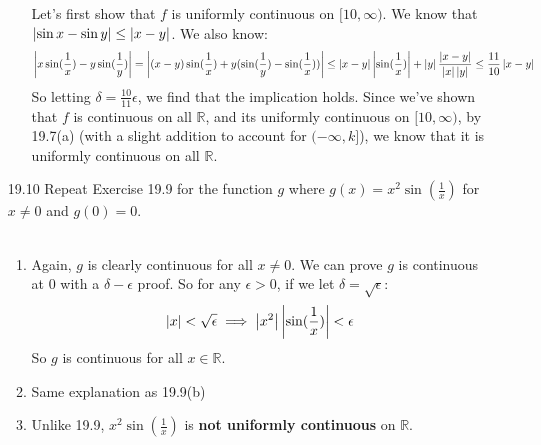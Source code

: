 \begin{enumerate}
\begin{enumerate}
        Let's first show that $f$ is uniformly continuous on $[10,\infty)$. We know that $\left\vert \sin x - \sin y \right\vert \leq \left\vert x - y \right\vert$. We also know:
        $$\left\vert x \sin(\frac{1}{x}) - y \sin(\frac{1}{y}) \right\vert = \left\vert (x-y)\sin(\frac{1}{x}) + y(\sin(\frac{1}{y}) - \sin(\frac{1}{x})) \right\vert \leq \left\vert x-y \right\vert \left\vert \sin(\frac{1}{x}) \right\vert + \left\vert y \right\vert \frac{\left\vert x-y \right\vert}{\left\vert x \right\vert \left\vert y \right\vert} \leq \frac{11}{10} \left\vert x-y \right\vert$$
        So letting $\delta = \frac{10}{11} \epsilon$, we find that the implication holds. Since we've shown that $f$ is continuous on all $\mathds{R}$, and its uniformly continuous on $[10,\infty)$, by 19.7(a) (with a slight addition to account for $(-\infty,k]$), we know that it is uniformly continuous on all $\mathds{R}$.
    \end{enumerate}
  \item [19.10]
    Repeat Exercise 19.9 for the function $g$ where $g(x) = x^2 \sin(\frac{1}{x})$ for $x \neq 0$ and $g(0) = 0$.\\\\

    \begin{enumerate}
      \item Again, $g$ is clearly continuous for all $x \neq 0$. We can prove $g$ is continuous at $0$ with a $\delta-\epsilon$ proof. So for any $\epsilon > 0$, if we let $\delta = \sqrt{\epsilon}$:
        $$\left\vert x \right\vert < \sqrt{\epsilon} \implies \left\vert x^2 \right\vert \left\vert \sin(\frac{1}{x}) \right\vert < \epsilon$$
        So $g$ is continuous for all $x \in \mathds{R}$.

      \item Same explanation as 19.9(b)
      \item Unlike 19.9, $x^2 \sin(\frac{1}{x})$ is \textbf{not uniformly continuous} on $\mathds{R}$.
    \end{enumerate}
\end{enumerate}


